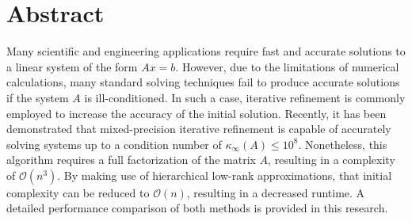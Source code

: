 \chapter*{Abstract}
\label{chap:abstract}

Many scientific and engineering applications require fast and accurate solutions to a linear system of the form $Ax = b$. However, due to the limitations of numerical calculations, many standard solving techniques fail to produce accurate solutions if the system $A$ is ill-conditioned. In such a case, iterative refinement is commonly employed to increase the accuracy of the initial solution. Recently, it has been demonstrated that mixed-precision iterative refinement is capable of accurately solving systems up to a condition number of $\kappa_\infty(A) \leq 10^8$. Nonetheless, this algorithm requires a full factorization of the matrix $A$, resulting in a complexity of $\mathcal{O}(n^3)$. By making use of hierarchical low-rank approximations, that initial complexity can be reduced to $\mathcal{O}(n)$, resulting in a decreased runtime. A detailed performance comparison of both methods is provided in this research.